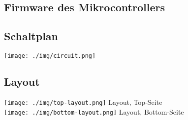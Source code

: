 \subsection{Firmware des Mikrocontrollers}
\lstset{style=C}



\begin{landscape}
\begin{center}
\subsection{Schaltplan}
\texttt{[image: ./img/circuit.png]}
\end{center}
\end{landscape}

\subsection{Layout}
\begin{center}
\texttt{[image: ./img/top-layout.png]}
Layout, Top-Seite
\bigskip \\
\texttt{[image: ./img/bottom-layout.png]}
Layout, Bottom-Seite \\
\end{center}
